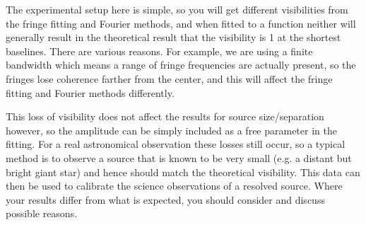 \documentclass[11pt]{article}
\begin{document}
The experimental setup here is simple, so you will get different visibilities from the fringe fitting and Fourier methods, and when fitted to a function neither will generally result in the theoretical result that the visibility is 1 at the shortest baselines. There are various reasons. For example, we are using a finite bandwidth which means a range of fringe frequencies are actually present, so the fringes lose coherence farther from the center, and this will affect the fringe fitting and Fourier methods differently.

This loss of visibility does not affect the results for source size/separation however, so the amplitude can be simply included as a free parameter in the fitting. For a real astronomical observation these losses still occur, so a typical method is to observe a source that is known to be very small (e.g. a distant but bright giant star) and hence should match the theoretical visibility. This data can then be used to calibrate the science observations of a resolved source. Where your results differ from what is expected, you should consider and discuss possible reasons.

\clearpage


\end{document}
